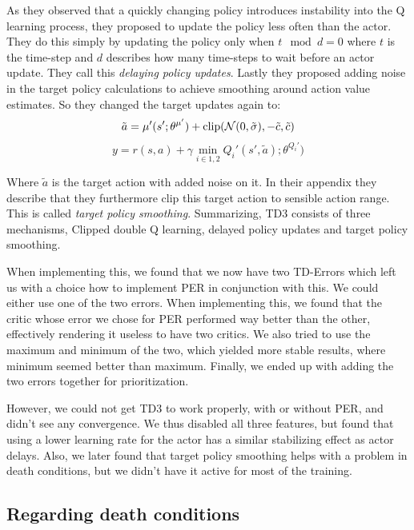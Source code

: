 \documentclass[hyperref,final,beleg]{cgvpub}
\begin{document}
As they observed that a quickly changing policy introduces instability into the Q learning process, they proposed to update the policy less often than the actor. They do this simply by updating the policy only when $t\mod d = 0$ where $t$ is the time-step and $d$ describes how many time-steps to wait before an actor update. They call this \textit{delaying policy updates}. Lastly they proposed adding noise in the target policy calculations to achieve smoothing around action value estimates. So they changed the target updates again to:
\begin{equation}
\tilde{a} = \mu'(s';\theta^{\mu'}) + \text{clip}(\mathcal{N}(0, \tilde{\sigma}), -\tilde{c}, \tilde{c})\\
\end{equation}
\begin{equation}
y = r(s, a) + \gamma \min_{i \in {1,2}} Q_i'(s', \tilde{a});\theta^{Q_i'})
\end{equation}

Where $\tilde{a}$ is the target action with added noise on it. In their appendix they describe that they furthermore clip this target action to sensible action range. This is called \textit{target policy smoothing}. Summarizing, \ac{TD3} consists of three mechanisms, Clipped double Q learning, delayed policy updates and target policy smoothing.

When implementing this, we found that we now have two \ac{TD-Error}s which left us with a choice how to implement \ac{PER} in conjunction with this. We could either use one of the two errors. When implementing this, we found that the critic whose error we chose for \ac{PER} performed way better than the other, effectively rendering it useless to have two critics. We also tried to use the maximum and minimum of the two, which yielded more stable results, where minimum seemed better than maximum. Finally, we ended up with adding the two errors together for prioritization.

However, we could not get \ac{TD3} to work properly, with or without \ac{PER}, and didn't see any convergence. We thus disabled all three features, but found that using a lower learning rate for the actor has a similar stabilizing effect as actor delays. Also, we later found that target policy smoothing helps with a problem in death conditions, but we didn't have it active for most of the training.

\subsection{Regarding death conditions}
\label{sec:death}
\end{document}
